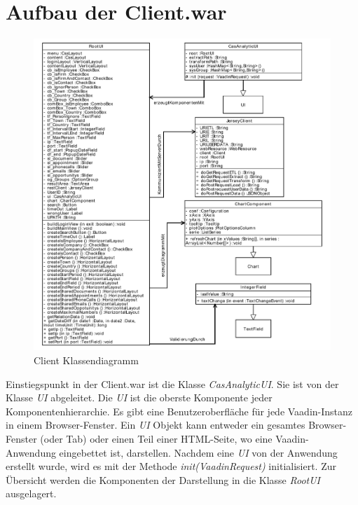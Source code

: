 \section{Aufbau der Client.war}
\label{ch:Umsetzung:sec:clientwar}

\begin{figure}[htbp]
\begin{center}
\includegraphics[width=1.0\textwidth]{pics/ClientKlassendiagramm.pdf}
\caption{Client Klassendiagramm}
\label{umsetzung_klassendiagramm_client}
\end{center}
\end{figure}

Einstiegspunkt in der Client.war ist die Klasse \textit{CasAnalyticUI}. Sie ist von der Klasse \textit{UI} abgeleitet. Die \textit{UI} ist die oberste Komponente jeder Komponentenhierarchie. Es gibt eine Benutzeroberfläche für jede Vaadin-Instanz in einem Browser-Fenster. Ein \textit{UI} Objekt kann entweder ein gesamtes Browser-Fenster (oder Tab) oder einen Teil einer HTML-Seite, wo eine Vaadin-Anwendung eingebettet ist, darstellen. Nachdem eine \textit{UI} von der Anwendung erstellt wurde, wird es mit der Methode \textit{init(VaadinRequest)} initialisiert. Zur Übersicht werden die Komponenten der Darstellung in die Klasse \textit{RootUI} ausgelagert. 


